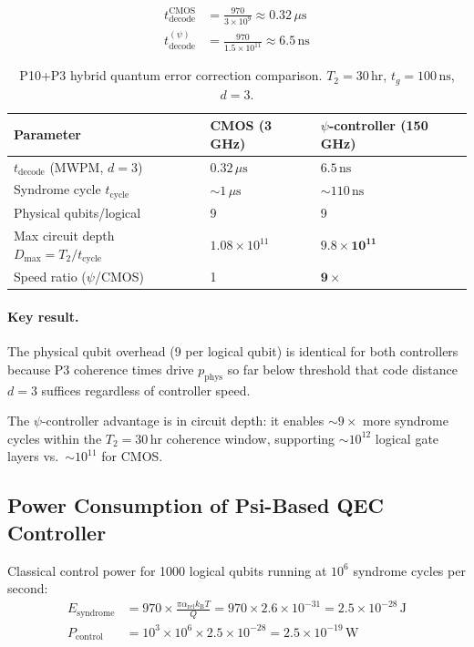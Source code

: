 \documentclass[11pt]{article}
\theoremstyle{definition}
\theoremstyle{remark}
\newcommand{\kB}{k_{\mathrm{B}}}
\begin{document}
\begin{align}
t_{\mathrm{decode}}^{\mathrm{CMOS}} &= \frac{970}{3\times 10^9} \approx 0.32\,\mu\mathrm{s}
\\
t_{\mathrm{decode}}^{(\psi)} &= \frac{970}{1.5\times 10^{11}} \approx 6.5\,\mathrm{ns}
\label{eq:decode_times}
\end{align}

\begin{table}[h]
\centering
\caption{P10+P3 hybrid quantum error correction comparison.
$T_2 = 30\,\mathrm{hr}$, $t_g = 100\,\mathrm{ns}$, $d = 3$.}
\label{tab:qec}
\begin{tabular}{@{}lll@{}}
\toprule
Parameter & CMOS (3 GHz) & $\psi$-controller (150 GHz) \\
\midrule
$t_{\mathrm{decode}}$ (MWPM, $d=3$) & $0.32\,\mu\mathrm{s}$ & $6.5\,\mathrm{ns}$ \\
Syndrome cycle $t_{\mathrm{cycle}}$ & $\sim 1\,\mu\mathrm{s}$ & $\sim 110\,\mathrm{ns}$ \\
Physical qubits/logical & 9 & 9 \\
Max circuit depth $D_{\max} = T_2/t_{\mathrm{cycle}}$ & $1.08\times 10^{11}$ & $\mathbf{9.8\times 10^{11}}$ \\
Speed ratio ($\psi$/CMOS) & 1 & $\mathbf{9\times}$ \\
\bottomrule
\end{tabular}
\end{table}

\paragraph{Key result.}
The physical qubit overhead (9 per logical qubit) is identical for
both controllers because P3 coherence times drive $p_{\mathrm{phys}}$
so far below threshold that code distance $d = 3$ suffices regardless
of controller speed.

The $\psi$-controller advantage is in circuit depth: it enables
$\sim 9\times$ more syndrome cycles within the $T_2 = 30\,\mathrm{hr}$
coherence window, supporting $\sim 10^{12}$ logical gate layers vs.\
$\sim 10^{11}$ for CMOS.

\subsection{Power Consumption of Psi-Based QEC Controller}

Classical control power for 1000 logical qubits running at $10^6$
syndrome cycles per second:
\begin{align}
E_{\mathrm{syndrome}} &= 970 \times \frac{\pi\alpha_{\mathrm{rel}}\kB T}{Q}
= 970 \times 2.6\times 10^{-31}
= 2.5\times 10^{-28}\,\mathrm{J} \\
P_{\mathrm{control}} &= 10^3 \times 10^6 \times 2.5\times 10^{-28}
= 2.5\times 10^{-19}\,\mathrm{W}
\end{align}
\end{document}
